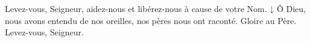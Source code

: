 Levez-vous, Seigneur, aidez-nous et libérez-nous à cause de votre Nom. ↓ Ô Dieu, nous avons entendu de nos oreilles, nos pères nous ont raconté. Gloire au Père. Levez-vous, Seigneur.

